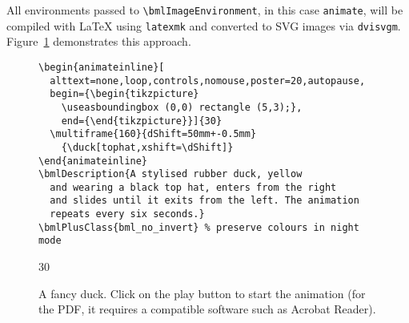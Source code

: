 \documentclass[a4paper,british]{article}
\def\ltxinline{\lstinline[style=bookml]}
\begin{document}
All environments passed to \ltxinline|\bmlImageEnvironment|, in this case \ltxinline|animate|, will be compiled with \LaTeX{} using \lstinline[frame=none]|latexmk| and converted to SVG images via \lstinline[frame=none]|dvisvgm|. Figure~\ref{fig:duck} demonstrates this approach.

\begin{figure}
  \begin{lstlisting}[style=bookml]
\begin{animateinline}[
  alttext=none,loop,controls,nomouse,poster=20,autopause,
  begin={\begin{tikzpicture}
    \useasboundingbox (0,0) rectangle (5,3);},
    end={\end{tikzpicture}}]{30}
  \multiframe{160}{dShift=50mm+-0.5mm}
    {\duck[tophat,xshift=\dShift]}
\end{animateinline}
\bmlDescription{A stylised rubber duck, yellow
  and wearing a black top hat, enters from the right
  and slides until it exits from the left. The animation
  repeats every six seconds.}
\bmlPlusClass{bml_no_invert} % preserve colours in night mode
  \end{lstlisting}
  \begin{center}
    \begin{animateinline}[
      alttext=none,loop,controls,nomouse,poster=20,autopause,
      poster=20,autopause,
      begin={\begin{tikzpicture}%
        \useasboundingbox (0,0) rectangle (5,3);},
        end={\end{tikzpicture}}]{30}
        {\duck[tophat,xshift=\dShift]}
    \end{animateinline}
  \end{center}
  \caption{A fancy duck. Click on the play button to start the animation (for the PDF, it requires a compatible software such as Acrobat Reader).}
  \label{fig:duck}
\end{figure}
\end{document}
